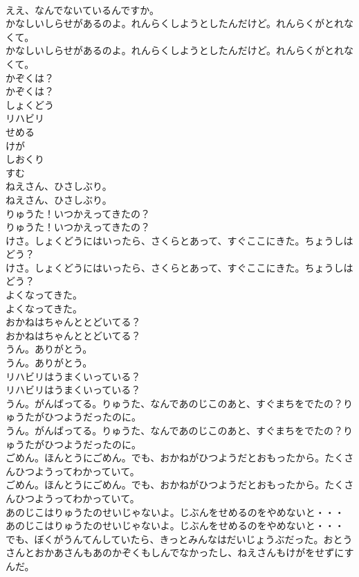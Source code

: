 \documentclass[8pt]{extreport}
\begin{document}
\begin{CJK}{UTF8}{min}
\\	ええ、なんでないているんですか。
\\	かなしいしらせがあるのよ。れんらくしようとしたんだけど。れんらくがとれなくて。
\\	かなしいしらせがあるのよ。れんらくしようとしたんだけど。れんらくがとれなくて。
\\	かぞくは？
\\	かぞくは？
\\	しょくどう
\\	リハビリ
\\	せめる
\\	けが
\\	しおくり
\\	すむ
\\	ねえさん、ひさしぶり。
\\	ねえさん、ひさしぶり。
\\	りゅうた！いつかえってきたの？
\\	りゅうた！いつかえってきたの？
\\	けさ。しょくどうにはいったら、さくらとあって、すぐここにきた。ちょうしはどう？
\\	けさ。しょくどうにはいったら、さくらとあって、すぐここにきた。ちょうしはどう？
\\	よくなってきた。
\\	よくなってきた。
\\	おかねはちゃんととどいてる？
\\	おかねはちゃんととどいてる？
\\	うん。ありがとう。
\\	うん。ありがとう。
\\	リハビリはうまくいっている？
\\	リハビリはうまくいっている？
\\	うん。がんばってる。りゅうた、なんであのじこのあと、すぐまちをでたの？りゅうたがひつようだったのに。
\\	うん。がんばってる。りゅうた、なんであのじこのあと、すぐまちをでたの？りゅうたがひつようだったのに。
\\	ごめん。ほんとうにごめん。でも、おかねがひつようだとおもったから。たくさんひつようってわかっていて。
\\	ごめん。ほんとうにごめん。でも、おかねがひつようだとおもったから。たくさんひつようってわかっていて。
\\	あのじこはりゅうたのせいじゃないよ。じぶんをせめるのをやめないと・・・
\\	あのじこはりゅうたのせいじゃないよ。じぶんをせめるのをやめないと・・・
\\	でも、ぼくがうんてんしていたら、きっとみんなはだいじょうぶだった。おとうさんとおかあさんもあのかぞくもしんでなかったし、ねえさんもけがをせずにすんだ。

\end{CJK}
\end{document}
